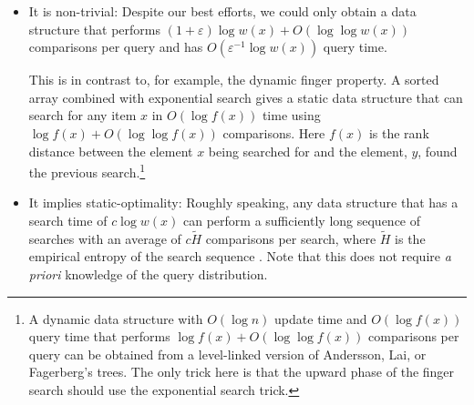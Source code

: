 \documentclass[lotsofwhite]{patmorin}
\begin{document}
\begin{itemize}
\item It is non-trivial: Despite our best efforts, we could only obtain
    a data structure that performs $(1+\varepsilon)\log w(x) + O(\log\log
    w(x))$ comparisons per query and has $O(\varepsilon^{-1}\log w(x))$
    query time.

    This is in contrast to, for example, the dynamic finger property.
    A sorted array combined with exponential search gives a static data
    structure that can search for any item $x$ in $O(\log f(x))$ time
    using $\log f(x) + O(\log\log f(x))$ comparisons.  Here $f(x)$ is the rank distance between the element $x$ being searched for and the element, $y$, found the previous search.\footnote{A dynamic
    data structure with
    $O(\log n)$ update time and $O(\log f(x))$ query time
    that performs $\log f(x) + O(\log\log f(x))$ comparisons per query
    can be obtained from a level-linked version of Andersson, Lai, or
    Fagerberg's trees. The only trick here is that the upward
    phase of the finger search should use the exponential search trick.}

\item It implies static-optimality: Roughly speaking, any data structure
    that has a search time of $c\log w(x)$ can perform a sufficiently long
    sequence of searches with an average of $c\tilde{H}$ comparisons per
    search, where $\tilde{H}$ is the empirical entropy of the search
    sequence \cite{X,Y}.  Note that this does not require \emph{a
    priori} knowledge of the query distribution.  
\end{itemize}
\end{document}
